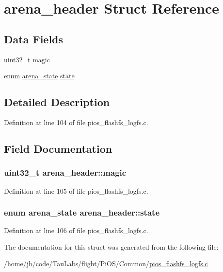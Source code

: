 \hypertarget{structarena__header}{\section{arena\-\_\-header \-Struct \-Reference}
\label{structarena__header}
}
\subsection*{\-Data \-Fields}
\begin{DoxyCompactItemize}
\item 
uint32\-\_\-t \hyperlink{structarena__header_a1e22aa4ce6a8f4c1bcfda08c0fd02071}{magic}
\item 
enum \hyperlink{group___p_i_o_s___f_l_a_s_h_f_s_gaa936149cfd5559190d20879c10e0fcee}{arena\-\_\-state} \hyperlink{structarena__header_a5e4eba89d3d72203e7dd0a324da74689}{state}
\end{DoxyCompactItemize}


\subsection{\-Detailed \-Description}


\-Definition at line 104 of file pios\-\_\-flashfs\-\_\-logfs.\-c.



\subsection{\-Field \-Documentation}
\hypertarget{structarena__header_a1e22aa4ce6a8f4c1bcfda08c0fd02071}{
\subsubsection[{magic}]{\setlength{\rightskip}{0pt plus 5cm}uint32\-\_\-t {\bf arena\-\_\-header\-::magic}}}\label{structarena__header_a1e22aa4ce6a8f4c1bcfda08c0fd02071}


\-Definition at line 105 of file pios\-\_\-flashfs\-\_\-logfs.\-c.

\hypertarget{structarena__header_a5e4eba89d3d72203e7dd0a324da74689}{
\subsubsection[{state}]{\setlength{\rightskip}{0pt plus 5cm}enum {\bf arena\-\_\-state} {\bf arena\-\_\-header\-::state}}}\label{structarena__header_a5e4eba89d3d72203e7dd0a324da74689}


\-Definition at line 106 of file pios\-\_\-flashfs\-\_\-logfs.\-c.



\-The documentation for this struct was generated from the following file\-:\begin{DoxyCompactItemize}
\item 
/home/jb/code/\-Tau\-Labs/flight/\-Pi\-O\-S/\-Common/\hyperlink{pios__flashfs__logfs_8c}{pios\-\_\-flashfs\-\_\-logfs.\-c}\end{DoxyCompactItemize}
